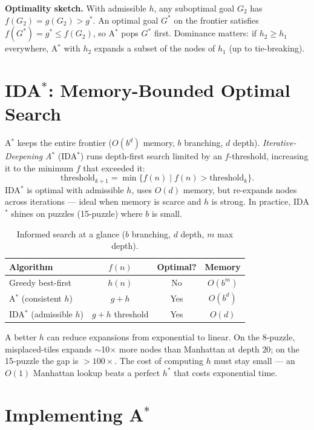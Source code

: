 \noindent\textbf{Optimality sketch.} With admissible $h$, any suboptimal goal $G_2$ has $f(G_2)=g(G_2)>g^{*}$. An optimal goal $G^{*}$ on the frontier satisfies $f(G^{*})=g^{*}\le f(G_2)$, so A$^{*}$ pops $G^{*}$ first. Dominance matters: if $h_2\ge h_1$ everywhere, A$^{*}$ with $h_2$ expands a subset of the nodes of $h_1$ (up to tie-breaking).

\section{IDA\texorpdfstring{$^{*}$}{*}: Memory-Bounded Optimal Search}
A$^{*}$ keeps the entire frontier ($O(b^{d})$ memory, $b$ branching, $d$ depth). \emph{Iterative-Deepening A$^{*}$} (IDA$^{*}$) runs depth-first search limited by an $f$-threshold, increasing it to the minimum $f$ that exceeded it:
\[
  \text{threshold}_{k+1}=\min\{f(n)\mid f(n)>\text{threshold}_{k}\}.
\]
IDA$^{*}$ is optimal with admissible $h$, uses $O(d)$ memory, but re-expands nodes across iterations --- ideal when memory is scarce and $h$ is strong. In practice, IDA$^{*}$ shines on puzzles (15-puzzle) where $b$ is small.

\begin{table}[h]\centering\small
\begin{tabular}{lccc}
\toprule
Algorithm & $f(n)$ & Optimal? & Memory\\
\midrule
Greedy best-first & $h(n)$ & No & $O(b^{m})$\\
A$^{*}$ (consistent $h$) & $g+h$ & Yes & $O(b^{d})$\\
IDA$^{*}$ (admissible $h$) & $g+h$ threshold & Yes & $O(d)$\\
\bottomrule
\end{tabular}
\caption{Informed search at a glance ($b$ branching, $d$ depth, $m$ max depth).}
\end{table}

\begin{remark}
A better $h$ can reduce expansions from exponential to linear. On the 8-puzzle, misplaced-tiles expands $\sim$10$\times$ more nodes than Manhattan at depth $20$; on the 15-puzzle the gap is $>100\times$. The cost of computing $h$ must stay small --- an $O(1)$ Manhattan lookup beats a perfect $h^{*}$ that costs exponential time.
\end{remark}

\section{Implementing A\texorpdfstring{$^{*}$}{*}}

